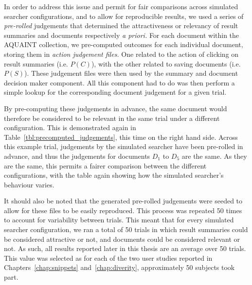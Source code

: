 In order to address this issue and permit for fair comparisons across simulated searcher configurations, and to allow for reproducible results, we used a series of \emph{pre-rolled} judgements that determined the attractiveness or relevancy of result summaries and documents respectively \emph{a priori.} For each document within the AQUAINT collection, we pre-computed outcomes for each individual document, storing them in \emph{action judgement files.} One related to the action of clicking on result summaries (i.e. $P(C)$), with the other related to saving documents (i.e. $P(S)$). These judgement files were then used by the summary and document decision maker component. All this component had to do was then perform a simple lookup for the corresponding document judgement for a given trial.

By pre-computing these judgements in advance, the same document would therefore be considered to be relevant in the same trial under a different configuration. This is demonstrated again in Table~\ref{tbl:precomputed_judgements}, this time on the right hand side. Across this example trial, judgements by the simulated searcher have been pre-rolled in advance, and thus the judgements for documents $D_1$ to $D_5$ are the same. As they are the same, this permits a fairer comparison between the different configurations, with the table again showing how the simulated searcher's behaviour varies.

It should also be noted that the generated pre-rolled judgements were seeded to allow for these files to be easily reproduced. This process was repeated 50 times to account for variability between trials. This meant that for every simulated searcher configuration, we ran a total of 50 trials in which result summaries could be considered attractive or not, and documents could be considered relevant or not. As such, all results reported later in this thesis are an average over 50 trials. This value was selected as for each of the two user studies reported in Chapters~\ref{chap:snippets} and~\ref{chap:diverity}, approximately 50 subjects took part.

